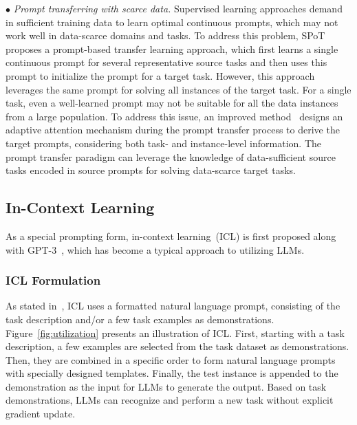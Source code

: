 {{{{{{$\bullet$  {\textit{Prompt transferring  with scarce data.} Supervised learning approaches demand in sufficient training data to learn optimal continuous prompts, which may not work well in data-scarce domains and tasks. To address this problem, SPoT~\cite{Vu-ACL-2022-SPoT} proposes a prompt-based transfer learning approach, which first learns {a single continuous prompt} for several representative source tasks and then uses this prompt to initialize the prompt for a target task.  {However, this approach leverages the same prompt for solving all instances of the target task. For a single task, even a well-learned prompt may not be suitable for all the data instances from a large population.} To address this issue, an improved method~\cite{Li-NAACL-2022-Learning} designs an adaptive attention mechanism during the prompt transfer process to derive the target prompts,  considering both task- and instance-level information. {The prompt transfer paradigm can leverage the knowledge of data-sufficient source tasks encoded in source prompts for  solving  data-scarce target tasks.} }

\subsection{In-Context Learning}
\label{subsec-icl}
As a special prompting form, in-context learning~(ICL) is first proposed along with GPT-3~\cite{Brown-NeurIPS-2020-Language}, which has become a typical approach to utilizing LLMs. 

\subsubsection{ICL Formulation}
\label{subsubsec-icl-formulation}

As stated in~\cite{Brown-NeurIPS-2020-Language}, ICL uses a formatted natural language prompt, consisting of the task description and/or a few task examples as demonstrations.
Figure~\ref{fig:utilization} presents an illustration of ICL. First, starting with a task description, a few examples are selected from the task dataset as demonstrations. Then, they are combined in a specific order to form natural language prompts with specially designed templates. Finally, the test instance is appended to the demonstration as the input for LLMs to generate the output. Based on task demonstrations, LLMs can recognize and perform a new task without explicit gradient update.

}}}}}}
